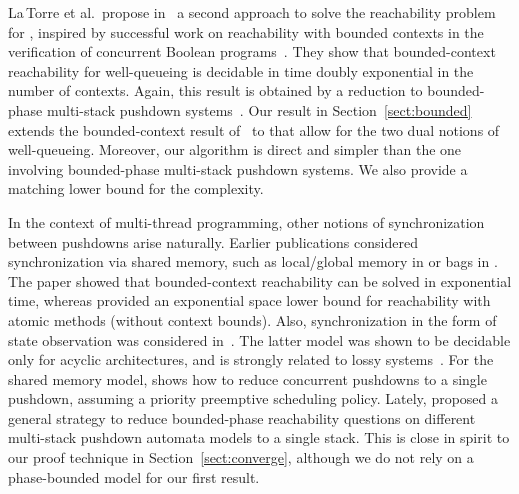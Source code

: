 \documentclass{LMCS}
\begin{document}
La\,Torre et al.~propose in~\cite{latorre-s-2008-299-a}  a second
approach to solve the reachability problem for \rqcp, inspired by successful
work on reachability with bounded contexts in the
verification of concurrent Boolean programs~\cite{qadeer-s-2005-93-a}.
They show that bounded-context reachability for
well-queueing \rqcp is decidable in time doubly exponential in the
number of contexts. Again, this result is obtained by a reduction to
bounded-phase multi-stack pushdown
systems~\cite{latorre-s-2007-161-a}. Our result in Section~\ref{sect:bounded}
extends the bounded-context result of~\cite{latorre-s-2007-161-a} to
\rqcp that allow for the two dual notions of well-queueing.
Moreover, our algorithm is direct and simpler than the one
involving bounded-phase multi-stack pushdown
systems. We also provide a matching lower bound for the complexity.






\medskip
{}
In the context of multi-thread programming, other notions of
synchronization between pushdowns arise naturally. Earlier
publications considered synchronization via shared memory, such as
local/global memory in
\cite{bouajjani-a-2005-348-a,bouajjani-a-2005-437-a} or bags in
\cite{sen-k-2006-300-a,jhala-r-2007-339-a}. The paper
\cite{bouajjani-a-2005-348-a} showed that bounded-context reachability
can be solved in exponential time, whereas \cite{sen-k-2006-300-a}
provided an exponential space lower bound for reachability with atomic
methods (without
context bounds).  Also, synchronization in the form of state
observation was considered in~\cite{atig-m-2008-356-a}. The latter
model was shown to be decidable only for acyclic architectures, and is
strongly related to lossy
systems~\cite{abdulla-p-1996-91-a,finkel-a-2001-63-a}.  For the shared
memory model, \cite{kidd10} shows how to reduce concurrent pushdowns
to a single pushdown, assuming a priority preemptive scheduling policy.  Lately,
\cite{seth-a-2010-615-a,atig-m-2010-117-b} proposed a general strategy
to reduce bounded-phase reachability questions on different
multi-stack pushdown automata models to a single stack. This is close
in spirit to our proof technique in Section~\ref{sect:converge},
although we do not rely on a phase-bounded model for our first
result. 
\end{document}
